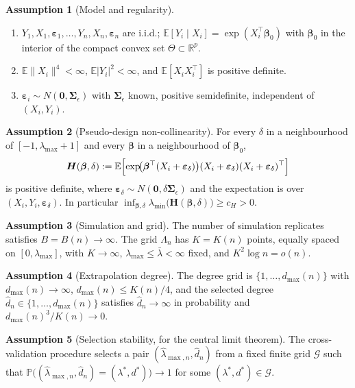 \documentclass[11pt]{article}
\theoremstyle{plain}
\theoremstyle{definition}
\newtheorem{assumption}{Assumption}
\newcommand{\E}{\mathbb{E}}
\newcommand{\R}{\mathbb{R}}
\newcommand{\Prob}{\mathbb{P}}
\newcommand{\bet}{\bm{\beta}}
\newcommand{\beps}{\bm{\varepsilon}}
\newcommand{\bSig}{\bm{\Sigma}}
\begin{document}
\begin{assumption}[Model and regularity]\label{app:ass:model}
\leavevmode
\begin{enumerate}\itemsep2pt
\item[(a)] $Y_1,X_1,\beps_1,\dots,Y_n,X_n,\beps_n$ are i.i.d.;
      $\E[Y_i\mid X_i]=\exp(X_i^\top\bet_0)$ with $\bet_0$ in the interior
      of the compact convex set $\Theta\subset\R^p$.
\item[(b)] $\E\|X_i\|^4<\infty$, $\E|Y_i|^2<\infty$, and
      $\E[X_iX_i^\top]$ is positive definite.
\item[(c)] $\beps_i\sim N(\bm 0,\bSig_\epsilon)$ with $\bSig_\epsilon$
      known, positive semidefinite, independent of $(X_i,Y_i)$.
\end{enumerate}
\end{assumption}

\begin{assumption}[Pseudo-design non-collinearity]\label{app:ass:pseudo}
For every $\delta$ in a neighbourhood of $[-1,\lambda_{\max}+1]$ and every
$\bet$ in a neighbourhood of $\bet_0$,
\[
  \bm H(\bet,\delta)
  := \E\Bigl[\exp\!\bigl(\bet^\top(X_i+\beps_\delta)\bigr)
      (X_i+\beps_\delta)(X_i+\beps_\delta)^\top\Bigr]
\]
is positive definite, where $\beps_\delta\sim N(\bm 0,\delta\bSig_\epsilon)$
and the expectation is over $(X_i,Y_i,\beps_\delta)$. In particular
$\inf_{\bet,\delta}\lambda_{\min}\bigl(\bm H(\bet,\delta)\bigr)\ge c_H>0$.
\end{assumption}

\begin{assumption}[Simulation and grid]\label{app:ass:simgrid}
The number of simulation replicates satisfies $B=B(n)\to\infty$. The grid
$\Lambda_n$ has $K=K(n)$ points, equally spaced on $[0,\lambda_{\max}]$,
with $K\to\infty$, $\lambda_{\max}\le\bar\lambda<\infty$ fixed, and
$K^2\log n=o(n)$.
\end{assumption}

\begin{assumption}[Extrapolation degree]\label{app:ass:degree}
The degree grid is $\{1,\dots,d_{\max}(n)\}$ with $d_{\max}(n)\to\infty$,
$d_{\max}(n)\le K(n)/4$, and the selected degree
$\hat d_n\in\{1,\dots,d_{\max}(n)\}$ satisfies
$\hat d_n\to\infty$ in probability and
$d_{\max}(n)^3/K(n)\to 0$.
\end{assumption}

\begin{assumption}[Selection stability, for the central limit
theorem]\label{app:ass:cv}
The cross-validation procedure selects a pair
$(\hat\lambda_{\max,n},\hat d_n)$ from a fixed finite grid
$\mathcal G$ such that
$\Prob\bigl((\hat\lambda_{\max,n},\hat d_n)=(\lambda^*,d^*)\bigr)\to 1$
for some $(\lambda^*,d^*)\in\mathcal G$.
\end{assumption}
\end{document}
